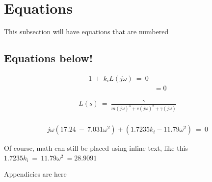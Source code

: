 \documentclass[12pt]{article} %
\begin{document}
\clearpage

\section{Equations}

This subsection will have equations that are numbered

\subsection{Equations below!}

\begin{align}
1\:+\:k_iL\left(j\omega \right)\:=\:0\\
                          &= 0
\end{align} 

\begin{align}
L\left(s\right)\:=\:\frac{\gamma }{m\left(j\omega \right)^3+c\left(j\omega \right)^2+\gamma \left(j\omega \right)}\nonumber\\
\end{align}

\begin{align*}
j\omega \left(17.24\:-\:7.031\omega^2\right)+\left(1.7235k_i-11.79\omega ^2\right)\:=\:0
\end{align*} 

Of course, math can still be placed using inline text, like this $1.7235k_i\:=\:11.79\omega ^2\:=28.9091$

\clearpage

\appendixpage
\appendix

Appendicies are here
\end{document}
